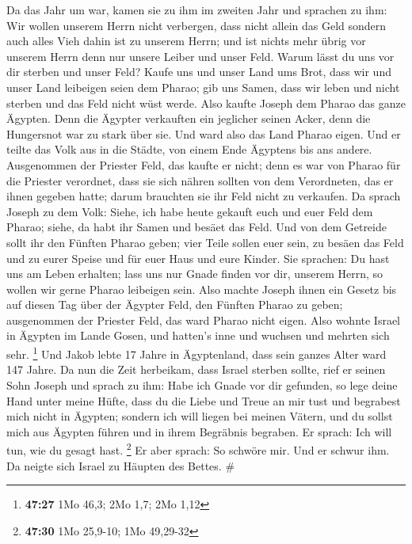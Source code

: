  Da das Jahr um war, kamen sie zu ihm im zweiten Jahr und
sprachen zu ihm: Wir wollen unserem Herrn nicht verbergen, dass nicht
allein das Geld sondern auch alles Vieh dahin ist zu unserem Herrn; und
ist nichts mehr übrig vor unserem Herrn denn nur unsere Leiber und unser
Feld.  Warum lässt du uns vor dir sterben und unser Feld?
Kaufe uns und unser Land ums Brot, dass wir und unser Land leibeigen
seien dem Pharao; gib uns Samen, dass wir leben und nicht sterben und
das Feld nicht wüst werde.  Also kaufte Joseph dem Pharao
das ganze Ägypten. Denn die Ägypter verkauften ein jeglicher seinen
Acker, denn die Hungersnot war zu stark über sie. Und ward also das Land
Pharao eigen.  Und er teilte das Volk aus in die Städte,
von einem Ende Ägyptens bis ans andere.  Ausgenommen der
Priester Feld, das kaufte er nicht; denn es war von Pharao für die
Priester verordnet, dass sie sich nähren sollten von dem Verordneten,
das er ihnen gegeben hatte; darum brauchten sie ihr Feld nicht zu
verkaufen.  Da sprach Joseph zu dem Volk: Siehe, ich habe
heute gekauft euch und euer Feld dem Pharao; siehe, da habt ihr Samen
und besäet das Feld.  Und von dem Getreide sollt ihr den
Fünften Pharao geben; vier Teile sollen euer sein, zu besäen das Feld
und zu eurer Speise und für euer Haus und eure Kinder. 
Sie sprachen: Du hast uns am Leben erhalten; lass uns nur Gnade finden
vor dir, unserem Herrn, so wollen wir gerne Pharao leibeigen sein.
 Also machte Joseph ihnen ein Gesetz bis auf diesen Tag
über der Ägypter Feld, den Fünften Pharao zu geben; ausgenommen der
Priester Feld, das ward Pharao nicht eigen.  Also wohnte
Israel in Ägypten im Lande Gosen, und hatten's inne und wuchsen und
mehrten sich sehr. \footnote{\textbf{47:27} 1Mo 46,3; 2Mo 1,7; 2Mo 1,12}
 Und Jakob lebte 17 Jahre in Ägyptenland, dass sein
ganzes Alter ward 147 Jahre.  Da nun die Zeit herbeikam,
dass Israel sterben sollte, rief er seinen Sohn Joseph und sprach zu
ihm: Habe ich Gnade vor dir gefunden, so lege deine Hand unter meine
Hüfte, dass du die Liebe und Treue an mir tust und begrabest mich nicht
in Ägypten;  sondern ich will liegen bei meinen Vätern,
und du sollst mich aus Ägypten führen und in ihrem Begräbnis begraben.
Er sprach: Ich will tun, wie du gesagt hast. \footnote{\textbf{47:30}
  1Mo 25,9-10; 1Mo 49,29-32}  Er aber sprach: So schwöre
mir. Und er schwur ihm. Da neigte sich Israel zu Häupten des Bettes. \#
